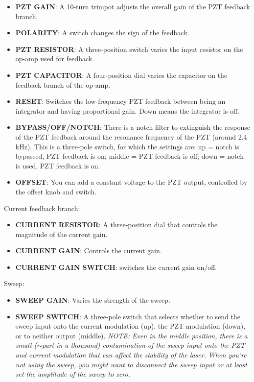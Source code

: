 \documentclass{../lab}
\begin{document}
\begin{itemize}
    \item \textbf{PZT GAIN}: A 10-turn trimpot adjusts the overall gain of the PZT feedback branch.

    \item \textbf{POLARITY}: A switch changes the sign of the feedback.

    \item \textbf{PZT RESISTOR}: A three-position switch varies the input resistor on the op-amp used for feedback.

    \item \textbf{PZT CAPACITOR}: A four-position dial varies the capacitor on the feedback branch of the op-amp.

    \item \textbf{RESET}: Switches the low-frequency PZT feedback between being an integrator and having proportional gain. Down means the integrator is off.

    \item \textbf{BYPASS/OFF/NOTCH}: There is a notch filter to extinguish the response of the PZT feedback around the resonance frequency of the PZT (around 2.4 kHz). This is a three-pole switch, for which the settings are: up = notch is bypassed, PZT feedback is on; middle = PZT feedback is off; down = notch is used, PZT feedback is on.

    \item \textbf{OFFSET}: You can add a constant voltage to the PZT output, controlled by the offset knob and switch.
\end{itemize}

Current feedback branch:

\begin{itemize}
    \item \textbf{CURRENT RESISTOR}: A three-position dial that controls the magnitude of the current gain.

    \item \textbf{CURRENT GAIN}: Controls the current gain.

    \item \textbf{CURRENT GAIN SWITCH}: switches the current gain on/off.
\end{itemize}

Sweep:

\begin{itemize}
    \item \textbf{SWEEP GAIN}: Varies the strength of the sweep.

    \item \textbf{SWEEP SWITCH}: A three-pole switch that selects whether to send the sweep input onto the current modulation (up), the PZT modulation (down), or to neither output (middle). \emph{NOTE: Even in the middle position, there is a small ($\sim$part in a thousand) contamination of the sweep input onto the PZT and current modulation that can affect the stability of the laser. When you're not using the sweep, you might want to disconnect the sweep input or at least set the amplitude of the sweep to zero.}
\end{itemize}
\end{document}
